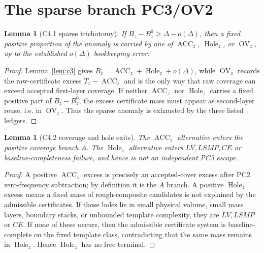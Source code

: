 \documentclass[11pt]{article}
\newtheorem{lemma}[theorem]{Lemma}
\theoremstyle{definition}
\newcommand{\ACC}{\operatorname{ACC}}
\newcommand{\Hole}{\operatorname{Hole}}
\newcommand{\OV}{\operatorname{OV}}
\begin{document}
\section{The sparse branch PC3/OV2}\label{sec:sparse}
\begin{lemma}[C4.1 sparse trichotomy]\label{lem:c4-trichotomy}
If $B_z-B_z^0\ge\Delta-o(\Delta)$, then a fixed positive proportion of the anomaly is carried by one of $\ACC_z$, $\Hole_z$, or $\OV_z$, up to the established $o(\Delta)$ bookkeeping error.
\end{lemma}
\begin{proof}
Lemma~\ref{lem:c3} gives $B_z=\ACC_z+\Hole_z+o(\Delta)$, while $\OV_z$ records the raw-certificate excess $T_z-\ACC_z$ and is the only way that raw coverage can exceed accepted first-layer coverage.  If neither $\ACC_z$ nor $\Hole_z$ carries a fixed positive part of $B_z-B_z^0$, the excess certificate mass must appear as second-layer reuse, i.e. in $\OV_z$.  Thus the sparse anomaly is exhausted by the three listed ledgers.
\end{proof}

\begin{lemma}[C4.2 coverage and hole exits]\label{lem:c4-acc-hole}
The $\ACC_z$ alternative enters the positive coverage branch $A$.  The $\Hole_z$ alternative enters $LV,LSMP,CE$ or baseline-completeness failure, and hence is not an independent PC3 escape.
\end{lemma}
\begin{proof}
A positive $\ACC_z$ excess is precisely an accepted-cover excess after PC2 zero-frequency subtraction; by definition it is the $A$ branch.  A positive $\Hole_z$ excess means a fixed mass of rough-composite candidates is not explained by the admissible certificates.  If those holes lie in small physical volume, small mass layers, boundary stacks, or unbounded template complexity, they are $LV,LSMP$ or $CE$.  If none of these occurs, then the admissible certificate system is baseline-complete on the fixed template class, contradicting that the same mass remains in $\Hole_z$.  Hence $\Hole_z$ has no free terminal.
\end{proof}
\end{document}
